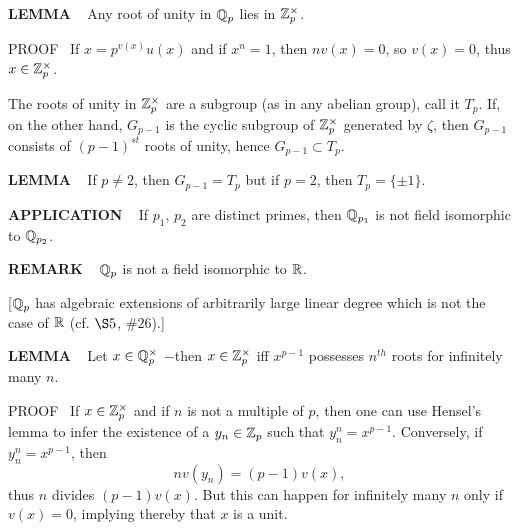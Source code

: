 \vspace{0.1cm}

\begin{x}{\small\bf LEMMA} \ %
Any root of unity in $\mathbb{Q}_p$ lies in $\mathbb{Z}_p^\times$.

PROOF \  
If $x = p^{v(x)}u(x)$ and if $x^n = 1$, then $n v(x) = 0$, so $v(x) = 0$, thus $x \in \mathbb{Z}_p^\times$.
\end{x}

\indent The roots of unity in $\mathbb{Z}_p^\times$ are a subgroup (as in any abelian group), call it $T_p$.  
If, on the other hand, $G_{p-1}$ is the cyclic subgroup of 
$\mathbb{Z}_p^\times$ generated by $\zeta$, 
then $G_{p-1}$ consists of  $(p-1)^{st}$ roots of unity, hence $G_{p-1} \subset T_p$.

\vspace{0.1cm}

\begin{x}{\small\bf LEMMA} \ %
If $p \ne 2$, then $G_{p-1} = T_p$ but if $p = 2$, then $T_p = \{\pm 1\}$.
\end{x}

\vspace{0.1cm}


\begin{x}{\small\bf APPLICATION} \ %
If $p_1$, $p_2$ are distinct primes, then $\mathbb{Q}_{p_1}$ is not field isomorphic to $\mathbb{Q}_{p_2}$.
\end{x}

\vspace{0.1cm}

\begin{x}{\small\bf REMARK} \ %
$\mathbb{Q}_p$ is not a field isomorphic to $\mathbb{R}$.

\vspace{0.1cm}

[$\mathbb{Q}_p$ has algebraic extensions of arbitrarily large linear degree which is not the case of $\mathbb{R}$ (cf. $\S5$, $\#26$).]
\end{x}

\vspace{0.1cm}


\begin{x}{\small\bf LEMMA} \ %
Let $x \in \mathbb{Q}_p^\times$ $-$then $x \in \mathbb{Z}_p^\times$ iff $x^{p-1}$ possesses $n^{th}$ roots for infinitely many $n$.

\vspace{0.1cm}

PROOF \   
If $x \in \mathbb{Z}_p^\times$ and if $n$ is not a multiple of $p$, then one can use Hensel's lemma to infer the existence of a $y_n \in \mathbb{Z}_p$ such that $y_n^n = x^{p-1}$.  Conversely, if $y_n^n = x^{p-1}$, then
\[
nv(y_n) = (p-1)v(x),
\]
thus $n$ divides $(p-1)v(x)$.  
But this can happen for infinitely many $n$ only if $v(x) = 0$, implying thereby that $x$ is a unit.
\end{x}


